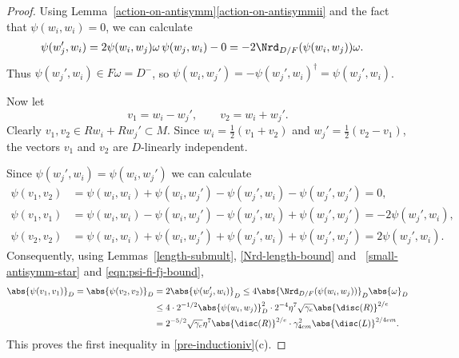 \begin{proof}
Using Lemma~\ref{action-on-antisymm}\eqref{action-on-antisymmii} and the fact that $\psi(w_i, w_i) = 0$, we can calculate
\begin{align*}
\psi(w_j', w_i)
& = 2 \psi(w_i, w_j) \omega \, \psi(w_j, w_i) - 0
= -2 \Nrd_{D/F}(\psi(w_i, w_j))\omega.
\end{align*}
Thus $\psi(w_j', w_i) \in F\omega = D^-$, so $\psi(w_i, w_j') = -\psi(w_j', w_i)^\dag = \psi(w_j', w_i)$.

Now let
\[
v_1 = w_i - w_j', \qquad v_2 = w_i + w_j'.
\]
Clearly $v_1, v_2 \in Rw_i + Rw_j' \subset M$.
Since $w_i = \frac{1}{2}(v_1 + v_2)$ and $w_j' = \frac{1}{2}(v_2 - v_1)$, the vectors $v_1$ and $v_2$ are $D$-linearly independent.

Since $\psi(w_j', w_i) = \psi(w_i, w_j')$ we can calculate
\begin{align*}
\psi(v_1, v_2)
& = \psi(w_i, w_i) + \psi(w_i, w_j') - \psi(w_j', w_i) - \psi(w_j', w_j')
= 0,
\\ \psi(v_1, v_1)
& = \psi(w_i, w_i) - \psi(w_i, w_j') - \psi(w_j', w_i) + \psi(w_j', w_j')
= -2\psi(w_j', w_i),
\\ \psi(v_2, v_2)
& = \psi(w_i, w_i) + \psi(w_i, w_j') + \psi(w_j', w_i) + \psi(w_j', w_j')
= 2\psi(w_j', w_i).
\end{align*}
Consequently, using Lemmas~\ref{length-submult}, \ref{Nrd-length-bound} and~ \ref{small-antisymm-star} and \eqref{eqn:psi-fi-fj-bound},
\begin{align*}
\abs{\psi(v_1, v_1)}_D = \abs{\psi(v_2, v_2)}_D
& = 2\abs{\psi(w_j', w_i)}_D
\leq 4 \abs{\Nrd_{D/F}(\psi(w_i, w_j))}_D \abs{\omega}_D
\\& \leq 4 \cdot 2^{-1/2} \abs{\psi(w_i, w_j)}_D^2 \cdot 2^{-4} \eta^7 \sqrt{\gamma_e} \abs{\disc(R)}^{2/e}
\\& = 2^{-5/2} \sqrt{\gamma_e} \eta^7 \abs{\disc(R)}^{2/e} \cdot \gamma_{4em}^2 \abs{\disc(L)}^{2/4em}.
\end{align*}
This proves the first inequality in \eqref{pre-inductioniv}(c).


\end{proof}
